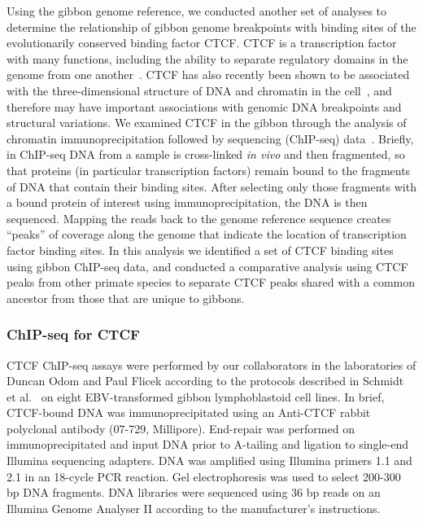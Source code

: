 Using the gibbon genome reference, we conducted another set of analyses to determine the relationship of gibbon genome breakpoints with binding sites of the evolutionarily conserved binding factor CTCF. CTCF is a transcription factor with many functions, including the ability to separate regulatory domains in the genome from one another~\cite{Phillips:2009fr}. CTCF has also recently been shown to be associated with the three-dimensional structure of DNA and chromatin in the cell~\cite{Dixon:2012gc}, and therefore may have important associations with genomic DNA breakpoints and structural variations. We examined CTCF in the gibbon through the analysis of chromatin immunoprecipitation followed by sequencing (ChIP-seq) data~\cite{Park:2009gl}. Briefly, in ChIP-seq DNA from a sample is cross-linked \emph{in vivo} and then fragmented, so that proteins (in particular transcription factors) remain bound to the fragments of DNA that contain their binding sites. After selecting only those fragments with a bound protein of interest using immunoprecipitation, the DNA is then sequenced. Mapping the reads back to the genome reference sequence creates ``peaks'' of coverage along the genome that indicate the location of transcription factor binding sites. In this analysis we identified a set of CTCF binding sites using gibbon ChIP-seq data, and conducted a comparative analysis using CTCF peaks from other primate species to separate CTCF peaks shared with a common ancestor from those that are unique to gibbons.

\subsubsection{ChIP-seq for CTCF}

CTCF ChIP-seq assays were performed by our collaborators in the laboratories of Duncan Odom and Paul Flicek according to the protocols described in Schmidt et al.~\cite{Schmidt:2012dt} on eight EBV-transformed gibbon lymphoblastoid cell lines. In brief, CTCF-bound DNA was immunoprecipitated using an Anti-CTCF rabbit polyclonal antibody (07-729, Millipore). End-repair was performed on immunoprecipitated and input DNA prior to A-tailing and ligation to single-end Illumina sequencing adapters. DNA was amplified using Illumina primers 1.1 and 2.1 in an 18-cycle PCR reaction. Gel electrophoresis was used to select 200-300 bp DNA fragments. DNA libraries were sequenced using 36 bp reads on an Illumina Genome Analyser II according to the manufacturer's instructions.

